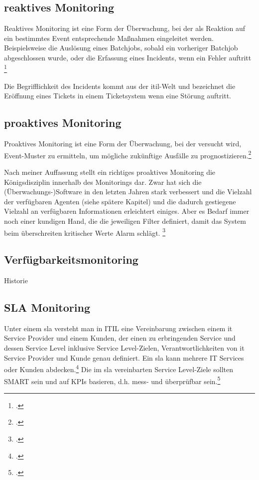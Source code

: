 \documentclass[12pt,a4paper,parskip]{scrreprt}
\begin{document}
	\subsection{reaktives Monitoring}
	\glqq Reaktives Monitoring ist eine Form der Überwachung, bei der als Reaktion auf ein bestimmtes Event entsprechende Maßnahmen eingeleitet werden. Beispielsweise die Auslösung eines Batchjobs, sobald ein vorheriger Batchjob abgeschlossen wurde, oder die Erfassung eines Incidents, wenn ein Fehler auftritt\grqq
	\footcite[S. 511]{ebelitilv3}
	
	Die Begrifflichkeit des Incidents kommt aus der \acrshort{itil}-Welt und bezeichnet die Eröffnung eines Tickets in einem Ticketsystem wenn eine Störung auftritt.
	 
	\subsection{proaktives Monitoring}
	\glqq Proaktives Monitoring ist eine Form der Überwachung, bei der versucht wird, Event-Muster zu ermitteln, um mögliche zukünftige Ausfälle zu prognostizieren.\grqq \footcite[S. 511]{ebelitilv3}
	
	Nach meiner Auffassung stellt ein richtiges proaktives Monitoring die Königsdisziplin innerhalb des Monitorings dar. Zwar hat sich die (Überwachungs-)Software in den letzten Jahren stark verbessert und die Vielzahl der verfügbaren Agenten (siehe spätere Kapitel) und die dadurch gestiegene Vielzahl an verfügbaren Informationen erleichtert einiges. Aber es Bedarf immer noch einer kundigen Hand, die die jeweiligen Filter definiert, damit das System beim überschreiten kritischer Werte Alarm schlägt. \footcite{Borkmann2009}
	\subsection{Verfügbarkeitsmonitoring}
	Historie
	\subsection{SLA Monitoring}
	Unter einem \acrfull{sla} versteht man in ITIL eine \glqq Vereinbarung zwischen einem \acrshort{it} Service Provider und einem Kunden, der einen zu erbringenden Service und dessen Service Level inklusive Service Level-Zielen, Verantwortlichkeiten von \acrshort{it} Service Provider und Kunde genau definiert. Ein \acrshort{sla} kann mehrere IT Services oder Kunden abdecken.\grqq \footcite[S. 732; Stichwort: Service Level Agreement]{ebelitilv3} Die im \acrshort{sla} vereinbarten Service Level-Ziele sollten SMART sein und auf KPIs basieren, d.h. mess- und überprüfbar sein.\footcite[S. 733; Stichwort: Service Level-Ziele]{ebelitilv3}
	
\end{document}
